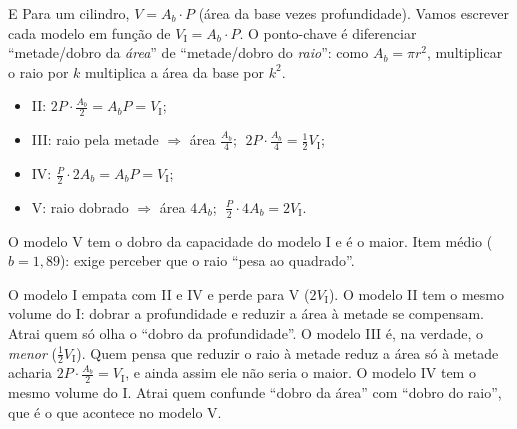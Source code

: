 \begin{resolucao}{E}
 Para um cilindro, $V = A_b\cdot P$ (área da base vezes
profundidade). Vamos escrever cada modelo em função de $V_{\text{I}} = A_b\cdot P$.
O ponto-chave é diferenciar “metade/dobro da \emph{área}” de “metade/dobro do
\emph{raio}”: como $A_b = \pi r^2$, multiplicar o raio por $k$ multiplica a área
da base por $k^2$.

\begin{itemize}[nosep,leftmargin=1.2em]
  \item II: $2P\cdot\frac{A_b}{2} = A_b P = V_{\text{I}}$;
  \item III: raio pela metade $\Rightarrow$ área $\frac{A_b}{4}$; $\;2P\cdot\frac{A_b}{4} = \frac12 V_{\text{I}}$;
  \item IV: $\frac{P}{2}\cdot 2A_b = A_b P = V_{\text{I}}$;
  \item V: raio dobrado $\Rightarrow$ área $4A_b$; $\;\frac{P}{2}\cdot 4A_b = 2V_{\text{I}}$.
\end{itemize}

 O modelo V tem o dobro da capacidade do modelo I e é o
maior. Item médio ($b = 1{,}89$): exige perceber que o raio “pesa ao quadrado”.

\begin{distratores}
 O modelo I empata com II e IV e perde para V ($2V_{\text{I}}$).
 O modelo II tem o mesmo volume do I: dobrar a profundidade e reduzir a
área à metade se compensam. Atrai quem só olha o “dobro da profundidade”.
 O modelo III é, na verdade, o \emph{menor} ($\frac12 V_{\text{I}}$). Quem
pensa que reduzir o raio à metade reduz a área só à metade acharia
$2P\cdot\frac{A_b}{2} = V_{\text{I}}$, e ainda assim ele não seria o maior.
 O modelo IV tem o mesmo volume do I. Atrai quem confunde “dobro da área”
com “dobro do raio”, que é o que acontece no modelo V.
\end{distratores}
\end{resolucao}

